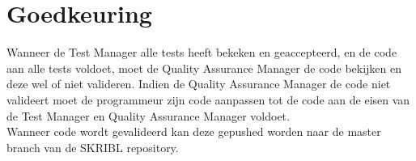 \documentclass{article}
\begin{document}
\section{Goedkeuring}
Wanneer de Test Manager alle tests heeft bekeken en geaccepteerd, en de code aan alle tests voldoet, moet de Quality Assurance Manager de code bekijken en deze wel of niet valideren.  Indien de Quality Assurance Manager de code niet valideert moet de programmeur zijn code aanpassen tot de code aan de eisen van de Test Manager en Quality Assurance Manager voldoet.
\\
Wanneer code wordt gevalideerd kan deze gepushed worden naar de master branch van de SKRIBL repository.


\clearpage
\end{document}
